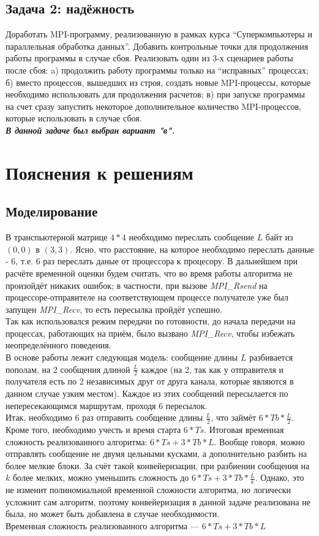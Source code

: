 \documentclass[a4paper]{article}
\begin{document}
\subsection{Задача 2: надёжность}
Доработать MPI-программу, реализованную в рамках курса “Суперкомпьютеры и параллельная обработка данных”. Добавить контрольные точки для продолжения работы программы в случае сбоя. Реализовать один из 3-х сценариев работы после сбоя: a) продолжить работу программы только на “исправных” процессах; б) вместо процессов, вышедших из строя, создать новые MPI-процессы, которые необходимо использовать для продолжения расчетов; в) при запуске программы на счет сразу запустить некоторое дополнительное количество MPI-процессов, которые использовать в случае сбоя.\\
\textit{\textbf{В данной задаче был выбран вариант "в".}}
\newpage

\section{Пояснения к решениям}
\subsection{Моделирование}
В транспьютерной матрице $4*4$ необходимо переслать сообщение $L$ байт из $(0, 0)$ в $(3, 3)$. Ясно, что расстояние, на которое необходимо переслать данные - $6$, т.е. 6 раз переслать даные от процессора к процесору. В дальнейшем при расчёте временной оценки будем считать, что во время работы алгоритма не произойдёт никаких ошибок; в частности, при вызове \textit{MPI\_Rsend} на процессоре-отправителе на соответствующем процессе получателе уже был запущен \textit{MPI\_Recv}, то есть пересылка пройдёт успешно.\\
Так как использовался режим передачи по готовности, до начала передачи на процессах, работающих на приём, было вызвано \textit{MPI\_Recv}, чтобы избежать неопределённого поведения.\\
В основе работы лежит следующая модель: сообщение длины $L$ разбивается пополам, на 2 сообщения длиной $\frac{L}{2}$ каждое (на 2, так как у отправителя и получателя есть по 2 независимых друг от друга канала, которые являются в данном случае узким местом). Каждое из этих сообщений пересылается по непересекающимся маршрутам, проходя 6 пересылок.\\
Итак, необходимо $6$ раз отправить сообщение длины $\frac{L}{2}$, что займёт $6*Tb*\frac{L}{2}$. Кроме того, необходимо учесть и время старта $6*Ts$. Итоговая временная сложность реализованного алгоритма: $6*Ts + 3*Tb*L$. Вообще говоря, можно отправлять сообщение не двумя цельными кусками, а дополнительно разбить на более мелкие блоки. За счёт такой конвейеризации, при разбиении сообщения на $k$ более мелких, можно уменьшить сложность до $6*Ts + 3*Tb*\frac{L}{k}$. Однако, это не изменит полиномиальной временной сложности алгоритма, но логически усложнит сам алгоритм, поэтому конвейеризация в данной задаче реализована не была, но может быть добавлена в случае необходимости.\\
Временная сложность реализованного алгоритма --- $6*Ts + 3*Tb*L$
\end{document}
